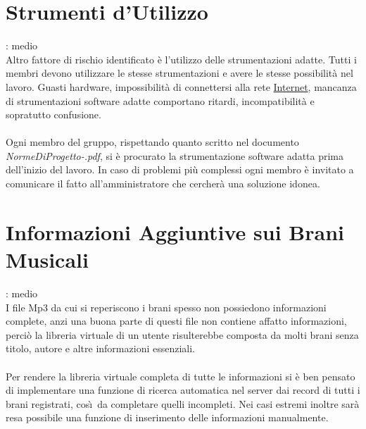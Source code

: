 \section{Strumenti d'Utilizzo}
: medio\\
Altro fattore di rischio identificato \`e l'utilizzo delle strumentazioni adatte. 
Tutti i membri devono utilizzare le stesse strumentazioni e avere le stesse possibilit\`a nel lavoro. 
Guasti hardware, impossibilit\`a di connettersi alla rete \underline{Internet},
mancanza di strumentazioni software adatte comportano ritardi, incompatibilit\`a e sopratutto confusione. \\
\\
Ogni membro del gruppo, 
rispettando quanto scritto nel documento
\emph{NormeDiProgetto-\versionenormeprogetto.pdf}, si \`e procurato la
strumentazione software adatta prima dell'inizio del lavoro. In caso di problemi
pi\`u complessi ogni membro \`e invitato a comunicare il fatto
all'amministratore che cercher\`a una soluzione idonea.

\section{Informazioni Aggiuntive sui Brani Musicali}
: medio\\
I file Mp3 da cui si reperiscono i brani spesso non possiedono informazioni
complete, anzi una buona parte di questi file non contiene affatto informazioni, perci\`o la libreria virtuale 
di un utente risulterebbe composta da molti brani senza titolo, autore e altre
informazioni essenziali.\\
\\
Per rendere la libreria virtuale completa di tutte le informazioni si \`e ben pensato di implementare una 
funzione di ricerca automatica nel server dai record di tutti i brani registrati, cos\`\i\ da completare 
quelli incompleti. Nei casi estremi inoltre sar\`a resa possibile una funzione
di inserimento delle informazioni manualmente.


\listoftables
{}
\listoffigures
{}

